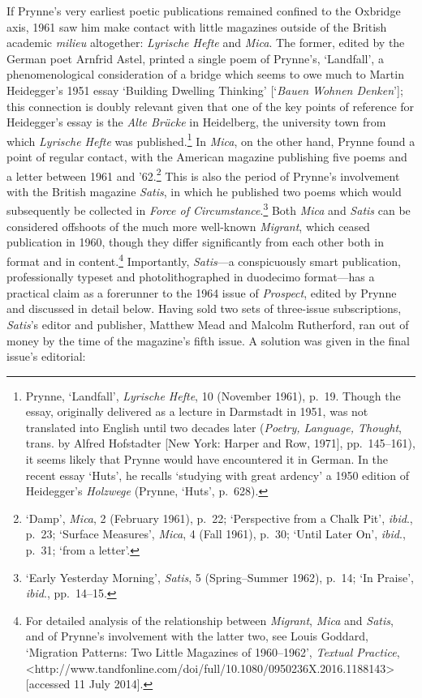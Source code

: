 \documentclass[]{article}
\begin{document}
If Prynne’s very earliest poetic publications remained confined to the
Oxbridge axis, 1961 saw him make contact with little magazines outside
of the British academic \emph{milieu} altogether: \emph{Lyrische Hefte}
and \emph{Mica}. The former, edited by the German poet Arnfrid Astel,
printed a single poem of Prynne’s, ‘Landfall’, a phenomenological
consideration of a bridge which seems to owe much to Martin Heidegger’s
1951 essay ‘Building Dwelling Thinking’ {[}‘\emph{Bauen Wohnen
Denken}’{]}; this connection is doubly relevant given that one of the
key points of reference for Heidegger’s essay is the \emph{Alte Brücke}
in Heidelberg, the university town from which \emph{Lyrische Hefte} was
published.\footnote{Prynne, ‘Landfall’, \emph{Lyrische Hefte}, 10
  (November 1961), p.~19. Though the essay, originally delivered as a
  lecture in Darmstadt in 1951, was not translated into English until
  two decades later (\emph{Poetry, Language, Thought}, trans. by Alfred
  Hofstadter {[}New York: Harper and Row, 1971{]}, pp.~145–161), it
  seems likely that Prynne would have encountered it in German. In the
  recent essay ‘Huts’, he recalls ‘studying with great ardency’ a 1950
  edition of Heidegger’s \emph{Holzwege} (Prynne, ‘Huts’, p.~628).} In
\emph{Mica}, on the other hand, Prynne found a point of regular contact,
with the American magazine publishing five poems and a letter between
1961 and ’62.\footnote{‘Damp’, \emph{Mica}, 2 (February 1961), p.~22;
  ‘Perspective from a Chalk Pit’, \emph{ibid}., p.~23; ‘Surface
  Measures’, \emph{Mica}, 4 (Fall 1961), p.~30; ‘Until Later On’,
  \emph{ibid}., p.~31; ‘from a letter’.} This is also the period of
Prynne’s involvement with the British magazine \emph{Satis}, in which he
published two poems which would subsequently be collected in \emph{Force
of Circumstance}.\footnote{‘Early Yesterday Morning’, \emph{Satis}, 5
  (Spring–Summer 1962), p.~14; ‘In Praise’, \emph{ibid}., pp.~14–15.}
Both \emph{Mica} and \emph{Satis} can be considered offshoots of the
much more well-known \emph{Migrant}, which ceased publication in 1960,
though they differ significantly from each other both in format and in
content.\footnote{For detailed analysis of the relationship between
  \emph{Migrant}, \emph{Mica} and \emph{Satis}, and of Prynne’s
  involvement with the latter two, see Louis Goddard, ‘Migration
  Patterns: Two Little Magazines of 1960–1962’, \emph{Textual Practice},
  \textless{}http://www.tandfonline.com/doi/full/10.1080/0950236X.2016.1188143\textgreater{}
  {[}accessed 11 July 2014{]}.} Importantly, \emph{Satis}—a
conspicuously smart publication, professionally typeset and
photolithographed in duodecimo format—has a practical claim as a
forerunner to the 1964 issue of \emph{Prospect}, edited by Prynne and
discussed in detail below. Having sold two sets of three-issue
subscriptions, \emph{Satis}’s editor and publisher, Matthew Mead and
Malcolm Rutherford, ran out of money by the time of the magazine’s fifth
issue. A solution was given in the final issue’s editorial:
\end{document}
